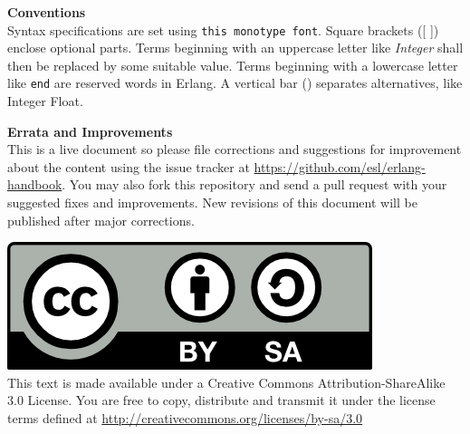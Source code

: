 \documentclass[oneside]{book}
\begin{document}
\vspace{20pt}
\textbf{Conventions}\\
Syntax specifications are set using \texttt{this monotype font}. Square brackets
([ ]) enclose optional parts. Terms beginning with an uppercase letter like
\textit{Integer} shall then be replaced by some suitable value. Terms beginning
with a lowercase letter like \texttt{end} are reserved words in Erlang. A
vertical bar (\textbar{}) separates alternatives, like Integer \textbar{} Float.

\vspace{20pt}
\textbf{Errata and Improvements}\\
This is a live document so please file corrections and suggestions for
improvement about the content using the issue tracker at
\url{https://github.com/esl/erlang-handbook}. You may also fork this repository
and send a pull request with your suggested fixes and improvements. New
revisions of this document will be published after major corrections.

\vspace{20pt}
\includegraphics[scale=0.7]{includes/cc-by-sa.png}\\ This text is made available
under a Creative Commons Attribution-ShareAlike 3.0 License. You are free to
copy, distribute and transmit it under the license terms defined at
\url{http://creativecommons.org/licenses/by-sa/3.0}

\newpage


\tableofcontents


























\end{document}
